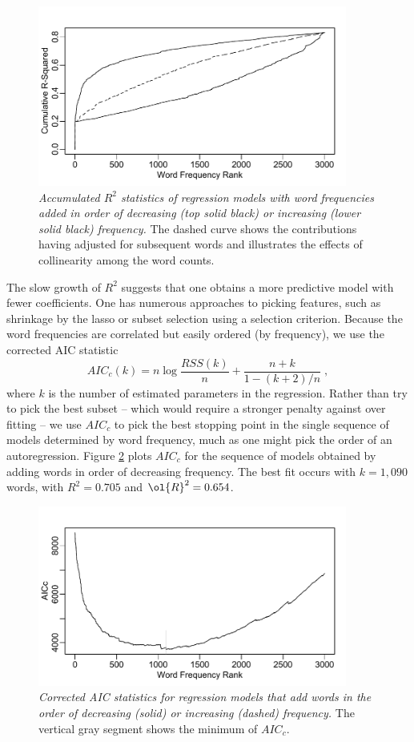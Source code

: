 \documentclass[10pt]{article}
\begin{document}
\begin{figure}
\caption{  \label{fig:cumr2}  
  {\sl Accumulated $R^2$ statistics of regression models with word frequencies added in order of decreasing (top solid black) or increasing (lower solid black) frequency.} The dashed curve shows the contributions having adjusted for subsequent words and illustrates the effects of collinearity among the word counts.}  
  \centerline{ \includegraphics[width=4in]{figures/cumr2.pdf} }
\end{figure}


The slow growth of $R^2$ suggests that one obtains a more predictive model with fewer coefficients.  One has numerous approaches to picking features, such as shrinkage by the lasso or subset selection using a selection criterion.  Because the word frequencies are correlated but easily ordered (by frequency), we use the corrected AIC statistic \citep{hurvich89}
\begin{equation}
    AIC_{c}(k) = n \log \frac{RSS(k)}{n} + \frac{n+k}{1-(k+2)/n} \;,
\end{equation}
where $k$ is the number of estimated parameters in the regression.  Rather than try to pick the best subset -- which would require a stronger penalty against over fitting -- we use $AIC_c$ to pick the best stopping point in the single sequence of models determined by word frequency, much as one might pick the order of an autoregression.  Figure \ref{fig:aicwords} plots $AIC_c$ for the sequence of models obtained by adding words in order of decreasing frequency.   The best fit  occurs with $k=1,090$ words, with $R^2 =  0.705$ and $\ol{R}^2=0.654$.  

\begin{figure}
\caption{  \label{fig:aicwords}  
  {\sl Corrected AIC statistics for regression models that add words in the order of decreasing (solid) or increasing (dashed) frequency.}  The vertical gray segment shows the minimum of $AIC_c$.}
  \centerline{ \includegraphics[width=4in]{figures/aicwords.pdf} }
\end{figure}
\end{document}
